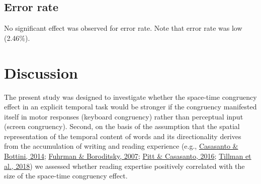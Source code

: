 \documentclass[
  a4paper,12pt,twoside,onecolumn,openright,final,oldfontcommands]{memoir}
\begin{document}
\hypertarget{error-rate}{%
\subsection{Error rate}\label{error-rate}}

No significant effect was observed for error rate. Note that error rate was low (2.46\%).

\hypertarget{discussion-4}{%
\section{Discussion}\label{discussion-4}}

The present study was designed to investigate whether the space-time congruency effect in an explicit temporal task would be stronger if the congruency manifested itself in motor responses (keyboard congruency) rather than perceptual input (screen congruency). Second, on the basis of the assumption that the spatial representation of the temporal content of words and its directionality derives from the accumulation of writing and reading experience (e.g., \protect\hyperlink{ref-casasanto_spatial_2014}{Casasanto \& Bottini, 2014}; \protect\hyperlink{ref-fuhrman_mental_2007}{Fuhrman \& Boroditsky, 2007}; \protect\hyperlink{ref-pitt_reading_2016}{Pitt \& Casasanto, 2016}; \protect\hyperlink{ref-tillman_mental_2018}{Tillman et al., 2018}) we assessed whether reading expertise positively correlated with the size of the space-time congruency effect.
\end{document}
